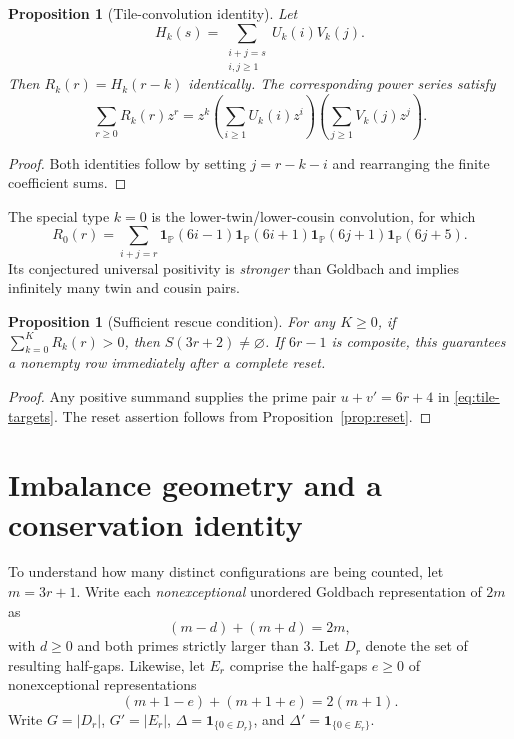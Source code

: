 \documentclass[11pt,a4paper]{article}
\newtheorem{proposition}[theorem]{Proposition}
\theoremstyle{definition}
\theoremstyle{remark}
\newcommand{\PP}{\mathbb P}
\newcommand{\ind}{\mathbf 1}
\begin{document}
\begin{proposition}[Tile-convolution identity]\label{prop:convolution}
Let
\begin{equation}
 H_k(s)=\sum_{\substack{i+j=s\\i,j\ge1}}U_k(i)V_k(j).
\end{equation}
Then $R_k(r)=H_k(r-k)$ identically.  The corresponding power series satisfy
\begin{equation}
 \sum_{r\ge0}R_k(r)z^r=z^k
 \left(\sum_{i\ge1}U_k(i)z^i\right)
 \left(\sum_{j\ge1}V_k(j)z^j\right).
\end{equation}
\end{proposition}
\begin{proof}
Both identities follow by setting $j=r-k-i$ and rearranging the finite coefficient sums.
\end{proof}

The special type $k=0$ is the lower-twin/lower-cousin convolution, for which
\begin{equation}\label{eq:H0}
 R_0(r)=\sum_{i+j=r}\ind_{\PP}(6i-1)\ind_{\PP}(6i+1)
                     \ind_{\PP}(6j+1)\ind_{\PP}(6j+5).
\end{equation}
Its conjectured universal positivity is \emph{stronger} than Goldbach and implies infinitely many twin and cousin pairs.

\begin{proposition}[Sufficient rescue condition]\label{prop:sufficient}
For any $K\ge0$, if $\sum_{k=0}^K R_k(r)>0$, then $S(3r+2)\ne\varnothing$.  If $6r-1$ is composite, this guarantees a nonempty row immediately after a complete reset.
\end{proposition}
\begin{proof}
Any positive summand supplies the prime pair $u+v'=6r+4$ in \eqref{eq:tile-targets}.  The reset assertion follows from Proposition~\ref{prop:reset}.
\end{proof}

\section{Imbalance geometry and a conservation identity}
To understand how many distinct configurations are being counted, let $m=3r+1$.  Write each \emph{nonexceptional} unordered Goldbach representation of $2m$ as
\begin{equation}
 (m-d)+(m+d)=2m,
\end{equation}
with $d\ge0$ and both primes strictly larger than $3$.  Let $D_r$ denote the set of resulting half-gaps.  Likewise, let $E_r$ comprise the half-gaps $e\ge0$ of nonexceptional representations
\begin{equation}
 (m+1-e)+(m+1+e)=2(m+1).
\end{equation}
Write $G=|D_r|$, $G'=|E_r|$, $\Delta=\ind_{\{0\in D_r\}}$, and $\Delta'=\ind_{\{0\in E_r\}}$.
\end{document}
